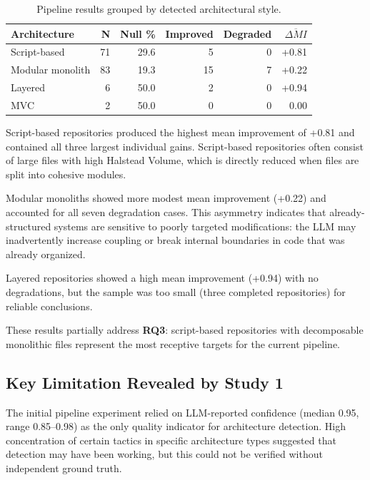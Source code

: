 \begin{table}[H]
\centering
\small
\caption{Pipeline results grouped by detected architectural style.}
\label{tab:eval_arch_results}
\begin{tabular}{lrrrrr}
\toprule
\textbf{Architecture} & \textbf{N} & \textbf{Null \%} & \textbf{Improved} & \textbf{Degraded} & $\overline{\Delta MI}$ \\
\midrule
Script-based & 71 & 29.6 & 5 & 0 & +0.81 \\
Modular monolith & 83 & 19.3 & 15 & 7 & +0.22 \\
Layered & 6 & 50.0 & 2 & 0 & +0.94 \\
MVC & 2 & 50.0 & 0 & 0 & 0.00 \\
\bottomrule
\end{tabular}
\end{table}

Script-based repositories produced the highest mean improvement of +0.81 and contained all three largest individual gains. Script-based repositories often consist of large files with high Halstead Volume, which is directly reduced when files are split into cohesive modules.

Modular monoliths showed more modest mean improvement (+0.22) and accounted for all seven degradation cases. This asymmetry indicates that already-structured systems are sensitive to poorly targeted modifications: the LLM may inadvertently increase coupling or break internal boundaries in code that was already organized.

Layered repositories showed a high mean improvement (+0.94) with no degradations, but the sample was too small (three completed repositories) for reliable conclusions.

These results partially address \textbf{RQ3}: script-based repositories with decomposable monolithic files represent the most receptive targets for the current pipeline.

\subsection{Key Limitation Revealed by Study 1}
\label{subsec:eval_pipeline_limitation}

The initial pipeline experiment relied on LLM-reported confidence (median 0.95, range 0.85--0.98) as the only quality indicator for architecture detection. High concentration of certain tactics in specific architecture types suggested that detection may have been working, but this could not be verified without independent ground truth.

